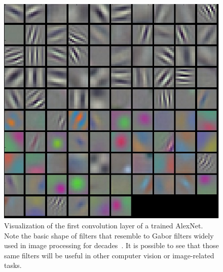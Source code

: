   \begin{figure}[!htbp]
    \centering
    \includegraphics[scale=0.4]{images/sota/filt1.jpeg}
    \caption[Convolution Neural Networks filters shape]{Visualization of the first convolution layer of a trained AlexNet. Note the basic shape of filters that resemble to Gabor filters widely used in image processing for decades~\citep{fogel1989gabor,jain1991unsupervised}. It is possible to see that those same filters will be useful in other computer vision or image-related tasks.}
    \label{fig:AlexNet_filters}
  \end{figure}

